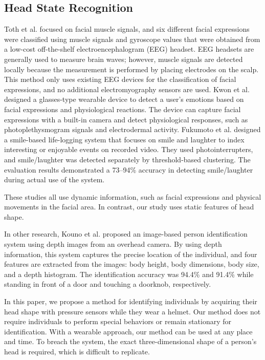\documentclass[english,preprint,JIP]{ipsj}
\begin{document}
\subsection{Head State Recognition}
Toth et al.\cite{facial_expression_headset} focused on facial muscle signals, and six different facial expressions were classified using muscle signals and gyroscope values that were obtained from a low-cost off-the-shelf electroencephalogram (EEG) headset. EEG headsets are generally used to measure brain waves; however, muscle signals are detected locally because the measurement is performed by placing electrodes on the scalp. This method only uses existing EEG devices for the classification of facial expressions, and no additional electromyography sensors are used. Kwon et al.\cite{facial_expression_glasses} designed a glasses-type wearable device to detect a user's emotions based on facial expressions and physiological reactions. The device can capture facial expressions with a built-in camera and detect physiological responses, such as photoplethysmogram signals and electrodermal activity. Fukumoto et al.\cite{fukumoto} designed a smile-based life-logging system that focuses on smile and laughter to index interesting or enjoyable events on recorded video. They used photointerrupters, and smile/laughter was detected separately by threshold-based clustering. The evaluation results demonstrated a 73–94\% accuracy in detecting smile/laughter during actual use of the system.\par

These studies all use dynamic information, such as facial expressions and physical movements in the facial area. In contrast, our study uses static features of head shape.\par

In other research, Kouno et al.\cite{head_top_camera} proposed an image-based person identification system using depth images from an overhead camera. By using depth information, this system captures the precise location of the individual, and four features are extracted from the images: body height, body dimensions, body size, and a depth histogram. The identification accuracy was 94.4\% and 91.4\% while standing in front of a door and touching a doorknob, respectively.\par

In this paper, we propose a method for identifying individuals by acquiring their head shape with pressure sensors while they wear a helmet. Our method does not require individuals to perform special behaviors or remain stationary for identification. With a wearable approach, our method can be used at any place and time. To breach the system, the exact three-dimensional shape of a person's head is required, which is difficult to replicate.
\end{document}
